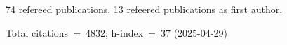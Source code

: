 74 refereed publications. 13 refeered publications as first author.

Total citations~=~4832; h-index~=~37 (2025-04-29)